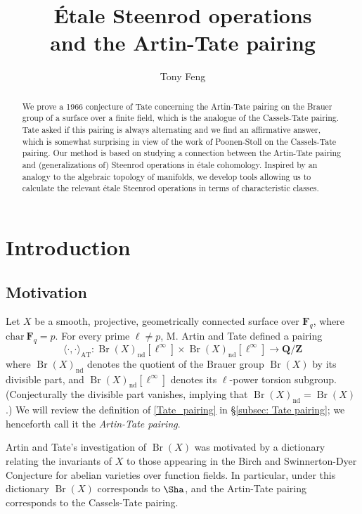 \documentclass[10pt, reqno]{amsart}
\title[\'{E}tale Steenrod operations and the Artin-Tate pairing]{ \'{E}tale Steenrod operations \\ and the Artin-Tate pairing }
\author{Tony Feng}
\numberwithin{equation}{subsection}
\newcommand{\F}{\mathbf{F}}
\newcommand{\Q}{\mathbf{Q}}
\newcommand{\Z}{\mathbf{Z}}
\newcommand{\mrm}[1]{\mathrm{#1}}
\DeclareMathOperator{\Br}{Br}
\DeclareMathOperator{\nd}{nd}
\theoremstyle{remark}
\begin{document}
\begin{abstract}
We prove a 1966 conjecture of Tate concerning the Artin-Tate pairing on the Brauer group of a surface over a finite field, which is the analogue of the Cassels-Tate pairing. Tate asked if this pairing is always alternating and we find an affirmative answer, which is somewhat surprising in view of the work of Poonen-Stoll on the Cassels-Tate pairing. Our method is based on studying a connection between the Artin-Tate pairing and (generalizations of) Steenrod operations in \'{e}tale cohomology. Inspired by an analogy to the algebraic topology of manifolds, we develop tools  allowing us to calculate the relevant \'{e}tale Steenrod operations in terms of characteristic classes.
\end{abstract}

\maketitle


\tableofcontents


\section{Introduction}\label{sec: introduction}
\subsection{Motivation}

Let $X$ be a smooth, projective, geometrically connected surface over $\F_q$, where $\mrm{char} \ \F_q = p$. For every prime $\ell \neq p$, M. Artin and Tate \cite{Tate66} defined a pairing 
\begin{equation}\label{Tate_pairing}
\langle  \cdot, \cdot \rangle_{\mrm{AT}}   \colon \Br(X)_{\nd}[\ell^{\infty}] \times \Br(X)_{\nd}[\ell^{\infty}] \rightarrow \Q/\Z
\end{equation}
where $\Br(X)_{\nd}$ denotes the quotient of the Brauer group $\Br(X)$ by its divisible part, and $\Br(X)_{\nd}[\ell^{\infty}] $ denotes its $\ell$-power torsion subgroup. (Conjecturally the divisible part vanishes, implying that $\Br(X)_{\nd} = \Br(X)$.) We will review the definition of \eqref{Tate_pairing} in \S \ref{subsec: Tate pairing}; we henceforth call it the \emph{Artin-Tate pairing}. 

Artin and Tate's investigation of $\Br(X)$ was motivated by a dictionary relating the invariants of $X$ to those appearing in the Birch and Swinnerton-Dyer Conjecture for abelian varieties over function fields. In particular, under this dictionary $\Br(X)$ corresponds to $\Sha$, and the Artin-Tate pairing corresponds to the Cassels-Tate pairing. 
\end{document}
